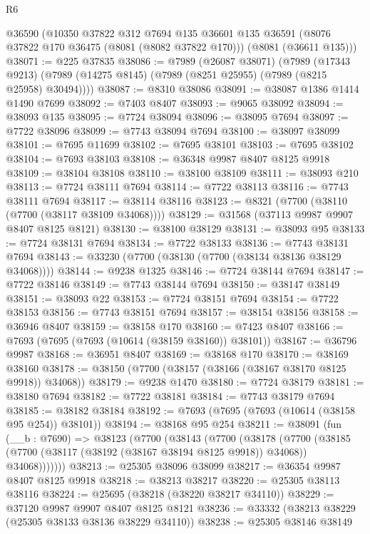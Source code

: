 \begin{lexlean}{R6}
\begin{coremodule}
    @36590
    (@10350
      @37822
      @312
      @7694
      @135
      @36601
      @135
      @36591
      (@8076 @37822 @170 @36475 (@8081 (@8082 @37822 @170)))
      (@8081 (@36611 @135)))
@38071 := @225 @37835
@38086 := @7989
    (@26087 @38071)
    (@7989
      (@17343 @9213)
      (@7989 (@14275 @8145) (@7989 (@8251 @25955) (@7989 (@8215 @25958) @30494))))
@38087 := @8310 @38086
@38091 := @38087 @1386 @1414 @1490 @7699
@38092 := @7403 @8407
@38093 := @9065 @38092
@38094 := @38093 @135
@38095 := @7724 @38094
@38096 := @38095 @7694
@38097 := @7722 @38096
@38099 := @7743 @38094 @7694
@38100 := @38097 @38099
@38101 := @7695 @11699
@38102 := @7695 @38101
@38103 := @7695 @38102
@38104 := @7693 @38103
@38108 := @36348 @9987 @8407 @8125 @9918
@38109 := @38104 @38108
@38110 := @38100 @38109
@38111 := @38093 @210
@38113 := @7724 @38111 @7694
@38114 := @7722 @38113
@38116 := @7743 @38111 @7694
@38117 := @38114 @38116
@38123 := @8321 (@7700 (@38110 (@7700 (@38117 @38109 @34068))))
@38129 := @31568 (@37113 @9987 @9907 @8407 @8125 @8121)
@38130 := @38100 @38129
@38131 := @38093 @95
@38133 := @7724 @38131 @7694
@38134 := @7722 @38133
@38136 := @7743 @38131 @7694
@38143 := @33230 (@7700 (@38130 (@7700 (@38134 @38136 @38129 @34068))))
@38144 := @9238 @1325
@38146 := @7724 @38144 @7694
@38147 := @7722 @38146
@38149 := @7743 @38144 @7694
@38150 := @38147 @38149
@38151 := @38093 @22
@38153 := @7724 @38151 @7694
@38154 := @7722 @38153
@38156 := @7743 @38151 @7694
@38157 := @38154 @38156
@38158 := @36946 @8407
@38159 := @38158 @170
@38160 := @7423 @8407
@38166 := @7693 (@7695 (@7693 (@10614 (@38159 @38160)) @38101))
@38167 := @36796 @9987
@38168 := @36951 @8407
@38169 := @38168 @170
@38170 := @38169 @38160
@38178 := @38150 (@7700 (@38157 (@38166 (@38167 @38170 @8125 @9918)) @34068))
@38179 := @9238 @1470
@38180 := @7724 @38179
@38181 := @38180 @7694
@38182 := @7722 @38181
@38184 := @7743 @38179 @7694
@38185 := @38182 @38184
@38192 := @7693 (@7695 (@7693 (@10614 (@38158 @95 @254)) @38101))
@38194 := @38168 @95 @254
@38211 := @38091
    (fun (__b : @7690) =>
    @38123
      (@7700
        (@38143
          (@7700
            (@38178
              (@7700
                (@38185 (@7700 (@38117 (@38192 (@38167 @38194 @8125 @9918)) @34068)) @34068)))))))
@38213 := @25305 @38096 @38099
@38217 := @36354 @9987 @8407 @8125 @9918
@38218 := @38213 @38217
@38220 := @25305 @38113 @38116
@38224 := @25695 (@38218 (@38220 @38217 @34110))
@38229 := @37120 @9987 @9907 @8407 @8125 @8121
@38236 := @33332 (@38213 @38229 (@25305 @38133 @38136 @38229 @34110))
@38238 := @25305 @38146 @38149

\end{coremodule}
\end{lexlean}

